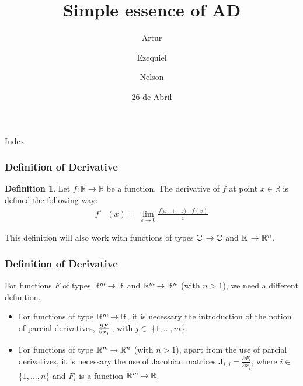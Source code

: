 \documentclass{beamer}
\title
{Simple essence of AD}
\author[Artur, Ezequiel, Nelson] 
{Artur \and Ezequiel \and Nelson}
\institute
{Universidade do Minho}
\date
{26 de Abril}
\theoremstyle{definition}
\newtheorem{defi}{Definition}[section]
\theoremstyle{definition}
\theoremstyle{theorem}
\def\R{\mathbb{R}}
\def\C{\mathbb{C}}
\begin{document}
\begin{frame}
  \titlepage
\end{frame}

\begin{frame}{Index}
  \tableofcontents
\end{frame}



\begin{frame}
\frametitle{Definition of Derivative}
\vspace{5mm}

\begin{defi}
		Let $f:\R \to \R$ be a function. The derivative of $f$ at point $x \in \R$ is defined the following way:
	\begin{align*}
	\textit{$f $$'$ $(x)$} = \ \lim_{\varepsilon \to 0} \frac{\textit{$f$($x$ $+$ $\varepsilon$) - $f(x)$}}{\varepsilon}
	\end{align*}
\end{defi}
\vspace{5mm}
\pause
This definition will also work with functions of types $\C \hspace{0.5mm}\to \C$ and $\R\hspace{0.6mm} \to \R^{n}$.

\end{frame}
\begin{frame}
\frametitle{Definition of Derivative}
\vspace{10mm}
For functions $F$ of types $\R^{m}\hspace{-0.3mm} \to \R$ and $\R^{m}\hspace{-0.3mm}\to \R^{n}$ (with $n>1$), we need a different definition.
\pause
\vspace{1mm}
    \begin{itemize}
    \item  For functions of type $\R^{m}\hspace{-0.3mm} \to \R$, it is necessary the introduction of the notion of parcial derivatives, $\frac{\partial F}{\partial x_{j}}\hspace{0.3mm}$, with $j \in$ \{$1,...,m$\}.
    
    \pause
    \vspace{3mm}
    \item For functions of type $\R^{m}\hspace{-0.3mm}\to \R^{n}$ (with $n>1$), apart from the use of parcial derivatives, it is necessary the use of Jacobian matrices $\mathbf{J}_{i,j} =\frac{\partial F_{i}}{\partial x_{j}}$, where $i \in$ \{$1,...,n$\} and $F_{i}$ is a function $\R^{m}\hspace{-0.3mm}\to \R$.
    \end{itemize} 
\end{frame}
\end{document}
